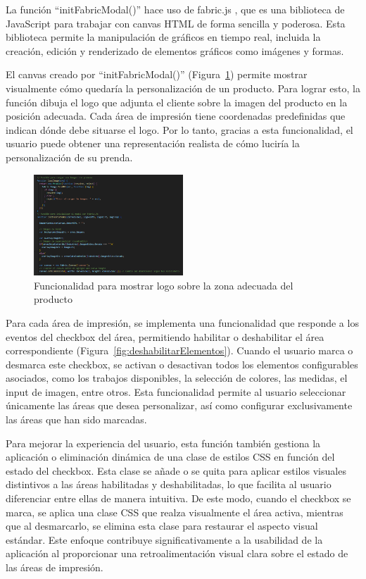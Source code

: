 \documentclass[11pt]{article}
\begin{document}
La función ``initFabricModal()'' hace uso de fabric.js \cite{fabric.js}, que es una biblioteca de JavaScript 
para trabajar con canvas HTML de forma sencilla y poderosa. Esta biblioteca permite la manipulación de gráficos 
en tiempo real, incluida la creación, edición y renderizado de elementos gráficos como imágenes y formas.

El canvas creado por ``initFabricModal()'' (Figura~\ref{fig:pintarLogo}) permite mostrar visualmente cómo quedaría la personalización de un producto. Para lograr esto, la 
función dibuja el logo que adjunta el cliente sobre la imagen del producto en la posición adecuada. Cada área de impresión tiene coordenadas 
predefinidas que indican dónde debe situarse el logo. Por lo tanto, gracias a esta funcionalidad, el usuario puede obtener una representación 
realista de cómo luciría la personalización de su prenda.

\begin{figure}[H]
    \centering
    \includegraphics[width=0.5\textwidth]{imagenesUS3-modal/FuncionalidadEspecialImagen.png}
    \caption{\label{fig:pintarLogo} Funcionalidad para mostrar logo sobre la zona adecuada del producto}
    \vspace{\fill}
\end{figure}

Para cada área de impresión, se implementa una funcionalidad que responde a los eventos del checkbox del área, permitiendo habilitar o deshabilitar 
el área correspondiente (Figura~\ref{fig:deshabilitarElementos}). Cuando el usuario marca o desmarca este checkbox, se activan o desactivan todos los elementos configurables asociados, 
como los trabajos disponibles, la selección de colores, las medidas, el input de imagen, entre otros. Esta funcionalidad permite al usuario seleccionar
únicamente las áreas que desea personalizar, así como configurar exclusivamente las áreas que han sido marcadas.

Para mejorar la experiencia del usuario, esta función también gestiona la aplicación o eliminación dinámica de una clase de estilos CSS en función del 
estado del checkbox. Esta clase se añade o se quita para aplicar estilos visuales distintivos a las áreas habilitadas y deshabilitadas, lo que facilita 
al usuario diferenciar entre ellas de manera intuitiva. De este modo, cuando el checkbox se marca, se aplica una clase CSS que realza visualmente el área activa,
mientras que al desmarcarlo, se elimina esta clase para restaurar el aspecto visual estándar. Este enfoque contribuye significativamente a la usabilidad de la 
aplicación al proporcionar una retroalimentación visual clara sobre el estado de las áreas de impresión.
\end{document}
